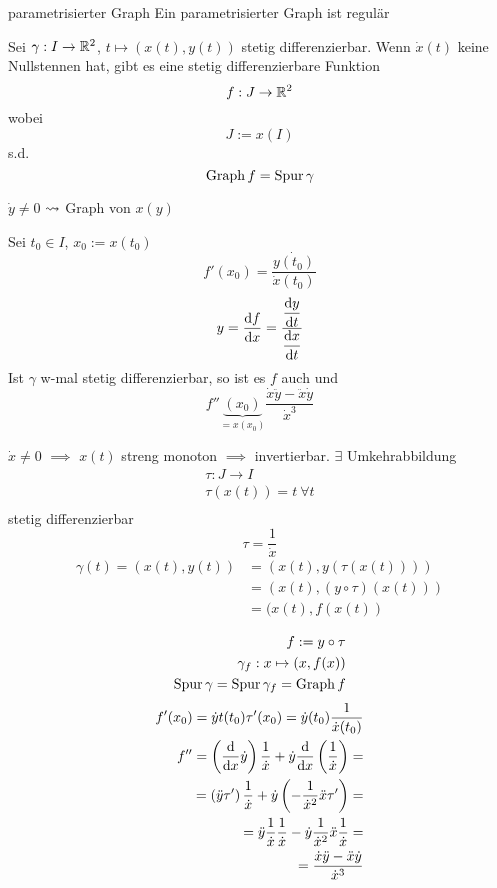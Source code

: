 \begin{Eig}{parametrisierter Graph}
  Ein parametrisierter Graph ist regulär
\end{Eig}
\begin{Sat}
  Sei $\gamma:I\to\mathbb{R}^2$, $t\mapsto(x(t),y(t))$ stetig differenzierbar. Wenn $\dot{x}(t)$ keine Nullstennen hat, gibt es eine stetig differenzierbare Funktion
  \[f:J\to\mathbb{R}^2\]
  wobei
  \[J:=x(I)\]
  s.d.
  \[\operatorname{Graph} f=\operatorname{Spur} \gamma\]
\end{Sat}
\begin{Bem}
  $\dot{y}\neq 0$ $\rightsquigarrow$ Graph von $x(y)$
\end{Bem}
\begin{Sat}
  Sei $t_0\in I$, $x_0:=x(t_0)$
  \[f'(x_0)=\frac{\dot{y(t_0)}}{\dot{x}(t_0)}\]
  \[y=\displaystyle\frac{\mathrm{d}f}{\mathrm{d}x}=\frac{\displaystyle\frac{\mathrm{d}y}{\mathrm{d}t}}{\displaystyle\frac{\mathrm{d}x}{\mathrm{d}t}}\]
  Ist $\gamma$ w-mal stetig differenzierbar, so ist es $f$ auch und
  \[f''\underbrace{(x_0)}_{=x(x_0)}\frac{\dot{x}\ddot{y}-\ddot{x}\dot{y}}{\dot{x}^3}\]
\end{Sat}
\begin{Bew}
  $\dot{x}\neq 0$ $\implies$ $x(t)$ streng monoton $\implies$ invertierbar. $\exists$ Umkehrabbildung
  \begin{align*}
    \tau:J\to I\\
    \tau(x(t))=t\ \forall t\\
  \end{align*}
  stetig differenzierbar
  \[\tau=\frac{1}{\dot{x}}\]
  \begin{align*}
    \gamma(t)=(x(t),y(t))&=\left( x(t),y(\tau(x(t))) \right)\\
    &=\left( x(t),(y\circ \tau)(x(t))\right)\\
    &=(x(t),f\left( x(t) \right)\\
  \end{align*}
  \begin{align*}
    f:=y\circ \tau\\
    \gamma_f:x\mapsto(x,f(x))\\
    \operatorname{Spur} \gamma=\operatorname{Spur} \gamma_f=\operatorname{Graph} f
  \end{align*}
  \begin{align*}
    f'(x_0)=\dot{y}t(t_0)\tau'(x_0)=\dot{y}(t_0)\frac{1}{\dot{x}(t_0)}\\
f''=\left( \displaystyle\frac{\mathrm{d}}{\mathrm{d}x}\dot{y} \right)\frac{1}{\dot{x}}+\dot{y}\displaystyle\frac{\mathrm{d}}{\mathrm{d}x}\left( \frac{1}{\dot{x}} \right)=\\
    =\left( \ddot{y}\tau' \right)\frac{1}{\dot{x}}+\dot{y}\left( -\frac{1}{\dot{x}^2}\ddot{x}\tau' \right)=\\
    =\ddot{y}\frac{1}{\dot{x}}\frac{1}{\dot{x}}-\dot{y}\frac{1}{\dot{x}^2}\ddot{x}\frac{1}{\dot{x}}=\\
    =\frac{\dot{x}\ddot{y}-\ddot{x}\dot{y}}{\dot{x}^3}
  \end{align*}
\end{Bew}
